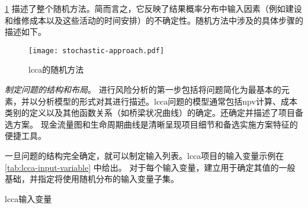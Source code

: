 \cref{fig:stochastic-approach-lcca} 描述了整个随机方法。简而言之，它反映了结果概率分布中输入因素（例如建设和维修成本以及这些活动的时间安排）的不确定性。随机方法中涉及的具体步骤的描述如下。

\begin{figure}
  \texttt{[image: stochastic-approach.pdf]}
  \caption{\acrlong*{lcca}的随机方法}
  \label{fig:stochastic-approach-lcca}
\end{figure}

\emph{制定问题的结构和布局}。 进行风险分析的第一步包括将问题简化为最基本的元素，并以分析模型的形式对其进行描述。\acrlong*{lcca}问题的模型通常包括\acrlong*{npv}计算、成本类别的定义以及其他函数关系（如桥梁状况曲线）的确定。还确定并描述了项目备选方案。 现金流量图和生命周期曲线是清晰呈现项目细节和备选实施方案特征的便捷工具。

一旦问题的结构完全确定，就可以制定输入列表。\acrlong*{lcca}项目的输入变量示例在 \cref{tab:lcca-input-variable} 中给出。 对于每个输入变量，建立用于确定其值的一般基础，并指定将使用随机分布的输入变量子集。

\begin{table}
  \caption{\acrlong*{lcca}输入变量}
  \label{tab:lcca-input-variable}
\end{table}

